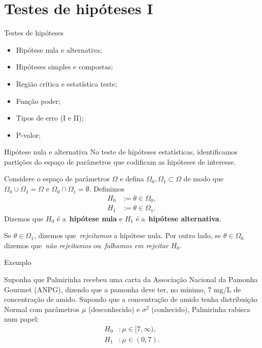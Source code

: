 \section{Testes de hipóteses I}
\begin{frame}{Testes de hipóteses}
 \begin{itemize}
  \item Hipótese nula e alternativa;
  \item Hipóteses simples e compostas;
  \item Região crítica e estatística teste;
  \item Função poder;
  \item Tipos de erro (I e II);
  \item P-valor;
   \end{itemize}
\end{frame}

\begin{frame}{Hipótese nula e alternativa}
 No teste de hipóteses estatísticas, identificamos partições do espaço de parâmetros que codificam as hipóteses de interesse.
 \begin{defn}
  Considere o espaço de parâmetros $\Omega$ e defina $\Omega_0, \Omega_1 \subset \Omega$ de modo que $\Omega_0 \cup \Omega_1 = \Omega$ e $\Omega_0 \cap \Omega_1 = \emptyset$.
  Definimos
  \begin{align*}
   H_0 &:= \theta \in \Omega_0,\\
   H_1 &:= \theta \in \Omega_1.
  \end{align*}
Dizemos que $H_0$ é a~\textbf{hipótese nula} e $H_1$ é a~\textbf{hipótese alternativa}.

Se $\theta \in \Omega_1$, dizemos que~\textit{rejeitamos} a hipótese nula.
Por outro lado, se $\theta \in \Omega_0$ dizemos que~\textit{não rejeitamos} ou~\textit{falhamos em rejeitar} $H_0$.
 \end{defn}
\end{frame}

\begin{frame}{Exemplo}

Suponha que Palmirinha recebeu uma carta da Associação Nacional da Pamonha Gourmet (ANPG), dizendo que a pamonha deve ter, no mínimo, 7 mg/L de concentração de amido.
Supondo que a concentração de amido tenha distribuição Normal com parâmetros $\mu$ (desconhecido) e $\sigma^2$ (conhecido), Palmirinha rabisca num papel:
  \begin{align*}
   H_0 &:\mu \in [7, \infty),\\
   H_1 &: \mu \in (0, 7).
  \end{align*}
\end{frame}

